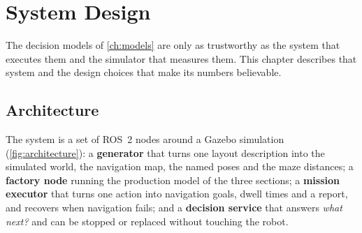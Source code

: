 \chapter{System Design}
\label{ch:system}

The decision models of \cref{ch:models} are only as trustworthy as the system that executes them
and the simulator that measures them. This chapter describes that system and the design choices
that make its numbers believable.

\section{Architecture}
\label{sec:architecture}

The system is a set of ROS~2 nodes around a Gazebo simulation (\cref{fig:architecture}): a
\textbf{generator} that turns one layout description into the simulated world, the navigation map,
the named poses and the maze distances; a \textbf{factory node} running the production model of the
three sections; a \textbf{mission executor} that turns one action into navigation goals, dwell
times and a report, and recovers when navigation fails; and a \textbf{decision service} that
answers \emph{what next?} and can be stopped or replaced without touching the robot.

